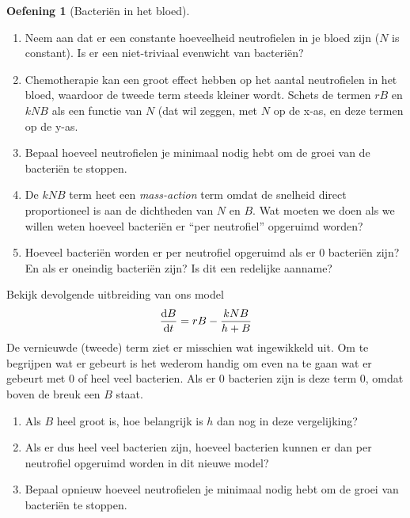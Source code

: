 \documentclass[
  a4paper,
]{scrbook}
\theoremstyle{definition}
\newtheorem{exercise}{Oefening}[chapter]
\theoremstyle{remark}
\begin{document}
\begin{exercise}[Bacteriën in het
bloed]
\begin{enumerate}
\def\labelenumi{\alph{enumi}.}
\setcounter{enumi}{2}
\item
  Neem aan dat er een constante hoeveelheid neutrofielen in je bloed
  zijn (\(N\) is constant). Is er een niet-triviaal evenwicht van
  bacteriën?
\item
  Chemotherapie kan een groot effect hebben op het aantal neutrofielen
  in het bloed, waardoor de tweede term steeds kleiner wordt. Schets de
  termen \(rB\) en \(kNB\) als een functie van \(N\) (dat wil zeggen,
  met \(N\) op de x-as, en deze termen op de y-as.
\item
  Bepaal hoeveel neutrofielen je minimaal nodig hebt om de groei van de
  bacteriën te stoppen.
\item
  De \(kNB\) term heet een \emph{mass-action} term omdat de snelheid
  direct proportioneel is aan de dichtheden van \(N\) en \(B\). Wat
  moeten we doen als we willen weten hoeveel bacteriën er ``per
  neutrofiel'' opgeruimd worden?
\item
  Hoeveel bacteriën worden er per neutrofiel opgeruimd als er 0
  bacteriën zijn? En als er oneindig bacteriën zijn? Is dit een
  redelijke aanname?
\end{enumerate}

Bekijk devolgende uitbreiding van ons model
\[\mathchoice{\frac{\mathrm{d}B}
{\mathrm{d}t}}{\mathrm{d}B/\mathrm{d}t}
{\mathrm{d}B/\mathrm{d}t}
{\mathrm{d}B/\mathrm{d}t}=rB-\frac{kNB}{h+B}  \] De vernieuwde (tweede)
term ziet er misschien wat ingewikkeld uit. Om te begrijpen wat er
gebeurt is het wederom handig om even na te gaan wat er gebeurt met 0 of
heel veel bacterien. Als er 0 bacterien zijn is deze term 0, omdat boven
de breuk een \(B\) staat.

\begin{enumerate}
\def\labelenumi{\alph{enumi}.}
\setcounter{enumi}{7}
\item
  Als \(B\) heel groot is, hoe belangrijk is \(h\) dan nog in deze
  vergelijking?
\item
  Als er dus heel veel bacterien zijn, hoeveel bacterien kunnen er dan
  per neutrofiel opgeruimd worden in dit nieuwe model?
\item
  Bepaal opnieuw hoeveel neutrofielen je minimaal nodig hebt om de groei
  van bacteriën te stoppen.
\end{enumerate}

\end{exercise}
\end{document}
